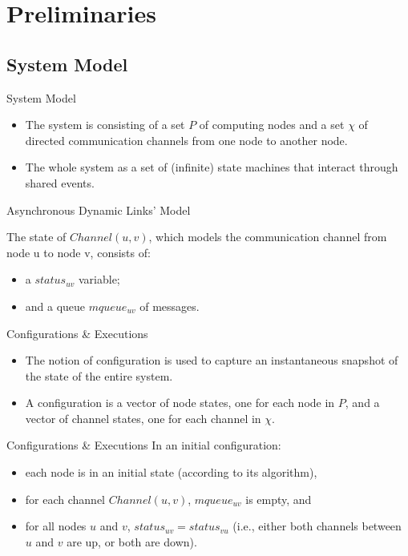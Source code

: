 \documentclass{beamer}
\begin{document}
\section{Preliminaries}
\subsection{System Model}

\begin{frame}{System Model}

\begin{itemize}
	\item The system is consisting of a set $P$ of computing nodes and a set $\chi$ of directed communication channels from one node to another node.
	\item The whole system as a set of (infinite) state machines that interact through shared events.

\end{itemize}

\end{frame}


\begin{frame}{Asynchronous Dynamic Links' Model}

	The state of $Channel(u, v)$, which models the communication channel from node u to node v, consists of:
	\begin{itemize}
		\item a $status_{uv}$ variable;
		\item and a queue $mqueue_{uv}$ of messages.
	\end{itemize}
	 

\end{frame}

\begin{frame}{Configurations \& Executions}

\begin{itemize}
	\item The notion of configuration is used to capture an instantaneous snapshot of the state of the entire system.
	\item A configuration is a vector of node states, one for each node in $P$, and a vector of channel states, one for each channel in $\chi$.
\end{itemize}

\end{frame}

\begin{frame}{Configurations \& Executions}
In an initial configuration:
\begin{itemize}
	\item each node is in an initial state (according to its algorithm), \item for each channel $Channel(u, v)$, $mqueue_{uv}$ is empty, and \item for all nodes $u$ and $v$, $status_{uv} = status_{vu}$ (i.e., either both channels between $u$ and $v$ are up, or both are down).
\end{itemize}
\end{frame}
\end{document}
